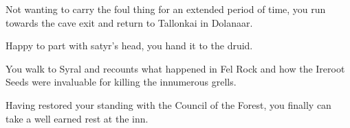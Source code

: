 Not wanting to carry the foul thing for an extended period of time, you run towards the cave exit and return to Tallonkai in Dolanaar.


Happy to part with satyr's head, you hand it to the druid.


You walk to Syral and recounts what happened in Fel Rock and how the Ireroot Seeds were invaluable for killing the innumerous grells.


Having restored your standing with the Council of the Forest, you finally can take a well earned rest at the inn.

